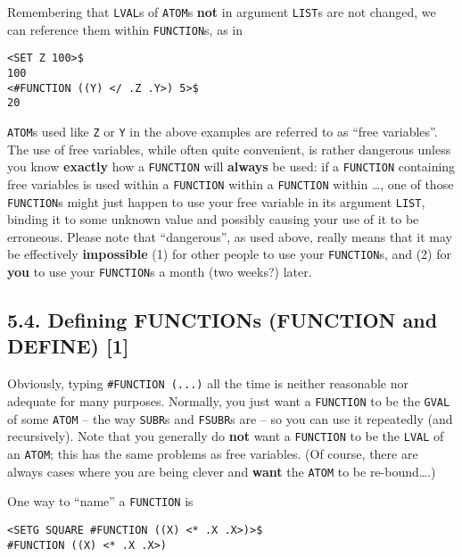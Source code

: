 \documentclass[a4paper,]{article}
\begin{document}
Remembering that \texttt{LVAL}s of \texttt{ATOM}s \textbf{not} in argument \texttt{LIST}s are not changed, we can reference
them within \texttt{FUNCTION}s, as in

\begin{verbatim}
<SET Z 100>$
100
<#FUNCTION ((Y) </ .Z .Y>) 5>$
20
\end{verbatim}

\texttt{ATOM}s used like \texttt{Z} or \texttt{Y} in the above examples are referred to as ``free variables''. The use of
free variables, while often quite convenient, is rather dangerous unless you know \textbf{exactly} how a \texttt{FUNCTION}
will \textbf{always} be used: if a \texttt{FUNCTION} containing free variables is used within a \texttt{FUNCTION} within a
\texttt{FUNCTION} within \ldots{}, one of those \texttt{FUNCTION}s might just happen to use your free variable in its
argument \texttt{LIST}, binding it to some unknown value and possibly causing your use of it to be erroneous. Please note
that ``dangerous'', as used above, really means that it may be effectively \textbf{impossible} (1) for other people to use
your \texttt{FUNCTION}s, and (2) for \textbf{you} to use your \texttt{FUNCTION}s a month (two weeks?) later.

\subsection{5.4. Defining FUNCTIONs (FUNCTION and DEFINE) {[}1{]}}\label{defining-functions-function-and-define-1}

Obviously, typing \texttt{\#FUNCTION\ (...)} all the time is neither reasonable nor adequate for many purposes. Normally,
you just want a \texttt{FUNCTION} to be the \texttt{GVAL} of some
\texttt{ATOM} -- the way \texttt{SUBR}s and \texttt{FSUBR}s are -- so you can use it repeatedly (and
recursively). Note that you generally do \textbf{not} want a \texttt{FUNCTION} to be the \texttt{LVAL} of an \texttt{ATOM};
this has the same problems as free variables. (Of course, there are always cases where you are being clever and
\textbf{want} the \texttt{ATOM} to be re-bound\ldots{}.)

One way to ``name'' a \texttt{FUNCTION} is

\begin{verbatim}
<SETG SQUARE #FUNCTION ((X) <* .X .X>)>$
#FUNCTION ((X) <* .X .X>)
\end{verbatim}
\end{document}
